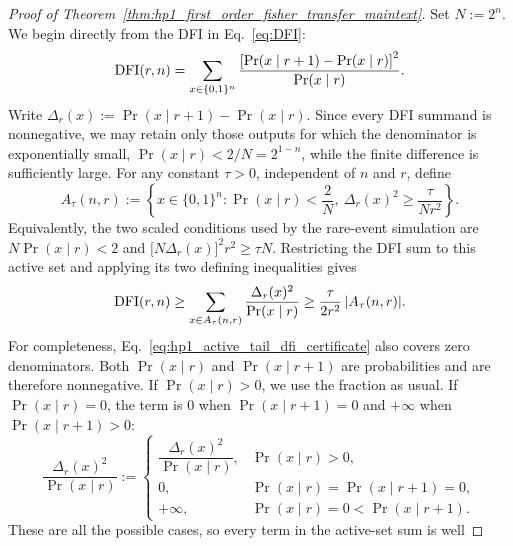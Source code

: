 \begin{proof}[Proof of Theorem~\ref{thm:hp1_first_order_fisher_transfer_maintext}]
Set \(N:=2^n\).  We begin directly from the DFI in Eq.~\eqref{eq:DFI}:
\begin{equation*}
    \mathrm{DFI}(r,n)
    =
    \sum_{x\in\{0,1\}^n}
    \frac{\left[\Pr(x\mid r+1)-\Pr(x\mid r)\right]^2}
    {\Pr(x\mid r)}.
\end{equation*}
Write \(\Delta_r(x):=\Pr(x\mid r+1)-\Pr(x\mid r)\).  Since every DFI
summand is nonnegative, we may retain only those outputs for which the
denominator is exponentially small, \(\Pr(x\mid r)<2/N=2^{1-n}\), while the
finite difference is sufficiently large.  For any constant \(\tau>0\),
independent of \(n\) and \(r\), define
\begin{equation}
    A_\tau(n,r)
    :=
    \left\{
        x\in\{0,1\}^n:
        \Pr(x\mid r)<\frac{2}{N},
        \ \Delta_r(x)^2\ge\frac{\tau}{Nr^2}
    \right\}.
    \label{eq:hp1_active_tail_set}
\end{equation}
Equivalently, the two scaled conditions used by the rare-event simulation are
\(N\Pr(x\mid r)<2\) and
\(\bigl[N\Delta_r(x)\bigr]^2r^2\ge\tau N\).
Restricting the DFI sum to this active set and applying its two defining
inequalities gives
\begin{equation}
    \mathrm{DFI}(r,n)
    \ge \sum_{x\in A_\tau(n,r)}
    \frac{\Delta_r(x)^2}{\Pr(x\mid r)}
    \ge \frac{\tau}{2r^2}\,\lvert A_\tau(n,r)\rvert.
    \label{eq:hp1_active_tail_dfi_certificate}
\end{equation}
For completeness, Eq.~\eqref{eq:hp1_active_tail_dfi_certificate} also covers
zero denominators.  Both \(\Pr(x\mid r)\) and \(\Pr(x\mid r+1)\) are
probabilities and are therefore nonnegative.  If \(\Pr(x\mid r)>0\), we use
the fraction as usual.  If \(\Pr(x\mid r)=0\), the term is \(0\) when
\(\Pr(x\mid r+1)=0\) and \(+\infty\) when \(\Pr(x\mid r+1)>0\):
\begin{equation}
    \frac{\Delta_r(x)^2}{\Pr(x\mid r)}
    :=
    \begin{cases}
        \dfrac{\Delta_r(x)^2}{\Pr(x\mid r)},
        & \Pr(x\mid r)>0,\\[1mm]
        0,
        & \Pr(x\mid r)=\Pr(x\mid r+1)=0,\\[1mm]
        +\infty,
        & \Pr(x\mid r)=0<\Pr(x\mid r+1).
    \end{cases}
    \label{eq:hp1_exact_pearson_zero_convention}
\end{equation}
These are all the possible cases, so every term in the active-set sum is well

\end{proof}
